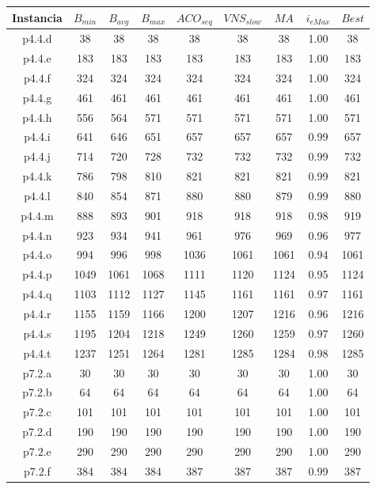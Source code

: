 \begin{table}
\begin{center}
\begin{tabular}{ |c|c|c|c|c|c|c|c|c| } 
\hline
Instancia & $B_{min}$ & $B_{avg}$ & $B_{max}$ & $ACO_{seq}$ & $VNS_{slow}$ & $MA$ & $i_{eMax}$ & $Best$ \\
\hline
p4.4.d & 38 & 38 & 38 & 38 & 38 & 38 & 1.00 & 38  \\
p4.4.e & 183 & 183 & 183 & 183 & 183 & 183 & 1.00 & 183  \\
p4.4.f & 324 & 324 & 324 & 324 & 324 & 324 & 1.00 & 324  \\
p4.4.g & 461 & 461 & 461 & 461 & 461 & 461 & 1.00 & 461  \\
p4.4.h & 556 & 564 & 571 & 571 & 571 & 571 & 1.00 & 571  \\
p4.4.i & 641 & 646 & 651 & 657 & 657 & 657 & 0.99 & 657  \\
p4.4.j & 714 & 720 & 728 & 732 & 732 & 732 & 0.99 & 732  \\
p4.4.k & 786 & 798 & 810 & 821 & 821 & 821 & 0.99 & 821  \\
p4.4.l & 840 & 854 & 871 & 880 & 880 & 879 & 0.99 & 880  \\
p4.4.m & 888 & 893 & 901 & 918 & 918 & 918 & 0.98 & 919  \\
p4.4.n & 923 & 934 & 941 & 961 & 976 & 969 & 0.96 & 977  \\
p4.4.o & 994 & 996 & 998 & 1036 & 1061 & 1061 & 0.94 & 1061  \\
p4.4.p & 1049 & 1061 & 1068 & 1111 & 1120 & 1124 & 0.95 & 1124  \\
p4.4.q & 1103 & 1112 & 1127 & 1145 & 1161 & 1161 & 0.97 & 1161  \\
p4.4.r & 1155 & 1159 & 1166 & 1200 & 1207 & 1216 & 0.96 & 1216  \\
p4.4.s & 1195 & 1204 & 1218 & 1249 & 1260 & 1259 & 0.97 & 1260  \\
p4.4.t & 1237 & 1251 & 1264 & 1281 & 1285 & 1284 & 0.98 & 1285  \\
p7.2.a & 30 & 30 & 30 & 30 & 30 & 30 & 1.00 & 30  \\
p7.2.b & 64 & 64 & 64 & 64 & 64 & 64 & 1.00 & 64  \\
p7.2.c & 101 & 101 & 101 & 101 & 101 & 101 & 1.00 & 101  \\
p7.2.d & 190 & 190 & 190 & 190 & 190 & 190 & 1.00 & 190  \\
p7.2.e & 290 & 290 & 290 & 290 & 290 & 290 & 1.00 & 290  \\
p7.2.f & 384 & 384 & 384 & 387 & 387 & 387 & 0.99 & 387  \\

\end{tabular}
\end{center}
\end{table}
